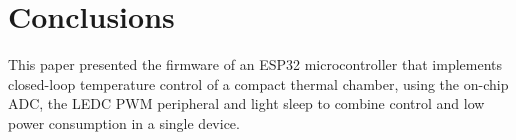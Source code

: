 \section{Conclusions}

This paper presented the firmware of an ESP32 microcontroller that implements closed-loop
temperature control of a compact thermal chamber, using the on-chip ADC, the LEDC PWM peripheral
and light sleep to combine control and low power consumption in a single device.
